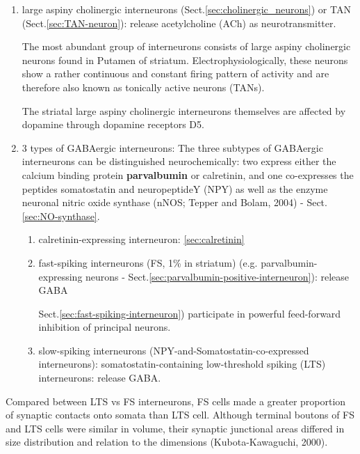 \begin{enumerate}
  
  \item large aspiny cholinergic interneurons
  (Sect.\ref{sec:cholinergic_neurons}) or TAN (Sect.\ref{sec:TAN-neuron}):
  release acetylcholine (ACh) as neurotransmitter.
  
  The most abundant group of interneurons consists of large aspiny cholinergic
  neurons found in Putamen of striatum. Electrophysiologically, these neurons
  show a rather continuous and constant firing pattern of activity and are
  therefore also known as tonically active neurons (TANs).
  
  The striatal large aspiny cholinergic interneurons themselves are
  affected by dopamine through dopamine receptors D5.
   
  \item {3 types of GABAergic interneurons}:
   The three subtypes of GABAergic interneurons can be distinguished
neurochemically: two express either the calcium binding protein {\bf
parvalbumin} or calretinin, and one co-expresses the peptides somatostatin and
neuropeptideY (NPY) as well as the enzyme neuronal nitric oxide synthase (nNOS;
Tepper and Bolam, 2004) - Sect.\ref{sec:NO-synthase}.
  
  \begin{enumerate}
    \item calretinin-expressing interneuron: \ref{sec:calretinin}
    
    \item fast-spiking interneurons (FS, 1\% in striatum) (e.g.
    parvalbumin-expressing neurons -
    Sect.\ref{sec:parvalbumin-positive-interneuron}): release GABA
  
  Sect.\ref{sec:fast-spiking-interneuron}) participate in powerful feed-forward
  inhibition of principal neurons.

    \item slow-spiking interneurons (NPY-and-Somatostatin-co-expressed
    interneurons): somatostatin-containing low-threshold spiking (LTS)
    interneurons: release GABA.
    \end{enumerate}
  
\end{enumerate}

Compared between LTS vs FS interneurons, FS cells  made  a  greater  proportion 
of synaptic contacts onto somata than LTS cell.
Although terminal boutons of FS and LTS cells were similar in volume, their
synaptic junctional areas differed  in  size  distribution  and  relation  to 
the  dimensions (Kubota-Kawaguchi, 2000).

